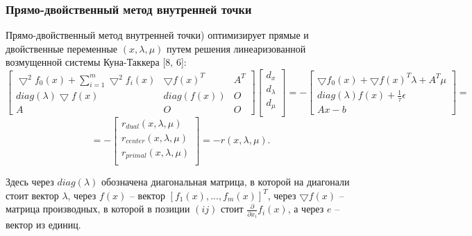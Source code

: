 \documentclass[12pt,a4paper]{article}
\begin{document}
\subsubsection{Прямо-двойственный метод внутренней точки}
Прямо-двойственный метод внутренней точки) оптимизирует прямые и двойственные переменные $(x, \lambda, \mu)$ путем решения линеаризованной возмущенной системы Куна-Таккера [8, 6]:
	\begin{equation}
		\left[
		\begin{matrix}
			\bigtriangledown^2f_0(x) + \sum_{i=1}^{m}	\bigtriangledown^2f_i(x)&  	\bigtriangledown f(x)^T & A^T\\ 
			diag(\lambda)\bigtriangledown f(x) & diag(f(x))  & O\\
			A & O & O
		\end{matrix}
		\right] 
		\left[
		\begin{matrix}
			d_x \\
			d_\lambda \\
			d_\mu \\
		\end{matrix}
		\right] = - 
		\left[
		\begin{matrix}
			\bigtriangledown f_0(x) + 	\bigtriangledown f(x)^T\lambda + A^T\mu \\  	
			diag(\lambda)f(x) + \frac{1}{\tau}\epsilon\\
			Ax - b
		\end{matrix}
		\right] =
	\end{equation}
	\begin{equation}
		 = - \left[
		\begin{matrix}
			r_{dual}(x, \lambda, \mu) \\
			r_{center}(x, \lambda, \mu) \\
			r_{primal}(x, \lambda, \mu) \\
		\end{matrix}
		\right] = -r(x, \lambda, \mu).
	\end{equation}

Здесь через $diag(\lambda)$ обозначена диагональная матрица, в которой на диагонали стоит вектор $\lambda$, через $f(x)$ – вектор $[f_1(x), . . . , f_m(x)]^T$, через $\bigtriangledown f(x)$ – матрица производных, в которой в позиции $(ij)$ стоит $\frac{\partial}{\partial x_i}f_i(x)$, а через $e$ – вектор из единиц.
\end{document}
